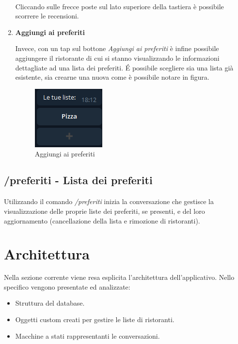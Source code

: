 \documentclass[a4paper, 12pt]{article}
\begin{document}
\begin{enumerate}
	\paragraph{}
	Cliccando sulle frecce poste sul lato superiore della tastiera è possibile scorrere le recensioni.
	
	\item \textbf{Aggiungi ai preferiti}
	
	Invece, con un tap sul bottone \textit{Aggiungi ai preferiti} è infine possibile aggiungere il ristorante di cui si stanno visualizzando le informazioni dettagliate ad una lista dei preferiti. É possibile scegliere sia una lista già esistente, sia crearne una nuova come è possibile notare in figura.
	\begin{figure}[!htb]
		\centering
		\includegraphics[scale=0.9]{cercaCommand_addToFavorites.png}
		\caption{Aggiungi ai preferiti}
	\end{figure}
	\paragraph{}	
	\end{enumerate}
	
	\newpage
	\subsection{/preferiti - Lista dei preferiti}
	\paragraph{}
	Utilizzando il comando \textit{/preferiti} inizia la conversazione che gestisce la visualizzazione delle proprie liste dei preferiti, se presenti, e del loro aggiornamento (cancellazione della lista e rimozione di ristoranti).
	
	
	\newpage
	\section{Architettura}
	Nella sezione corrente viene resa esplicita l'architettura dell'applicativo. Nello specifico vengono presentate ed analizzate:
	\begin{itemize}
		\item Struttura del database.
		\item Oggetti custom creati per gestire le liste di ristoranti.
		\item Macchine a stati rappresentanti le conversazioni.
	\end{itemize}
\end{document}
